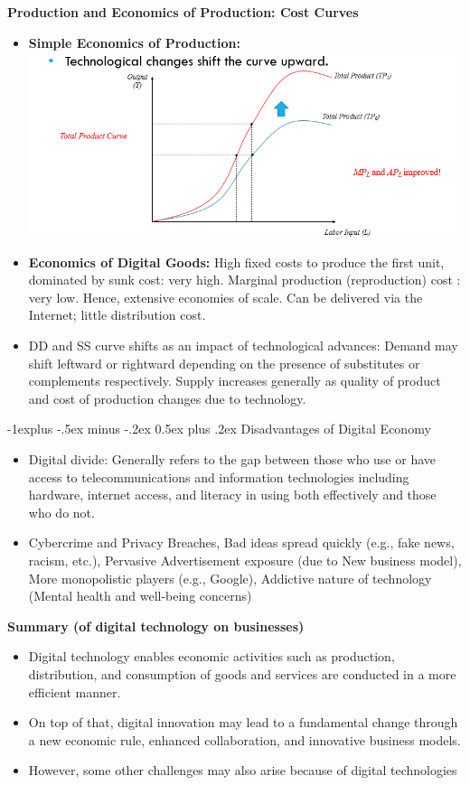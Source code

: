 \documentclass[12pt, landscape]{article}
\makeatletter
\renewcommand{\subsection}{\@startsection{subsection}{2}{0mm}%
                                {-1explus -.5ex minus -.2ex}%
                                {0.5ex plus .2ex}%
                                {\normalfont\normalsize\bfseries}}
\makeatother
\begin{document}
\begin{multicols*}{3}
\textbf{Production and Economics of Production: Cost Curves}
\begin{itemize}
\item \textbf{Simple Economics of Production:}
\includegraphics[width=0.7\linewidth]{technologicalChange}
\item \textbf{Economics of Digital Goods:} High fixed costs to produce the first unit, dominated by sunk cost: very high. Marginal production (reproduction) cost : very low. Hence, extensive economies of scale. Can be delivered via the Internet; little distribution cost.
\item DD and SS curve shifts as an impact of technological advances: Demand may shift leftward or rightward depending on the presence of substitutes or complements respectively. Supply increases generally as quality of product and cost of production changes due to technology.
\end{itemize}

\subsection{Disadvantages of Digital Economy}
\begin{itemize}
\item Digital divide: Generally refers to the gap between those who use or have access to telecommunications and information technologies including hardware, internet access, and literacy in using both effectively and those who do not.
\item Cybercrime and Privacy Breaches, Bad ideas spread quickly (e.g., fake news, racism, etc.), Pervasive Advertisement exposure (due to New business model), More monopolistic players (e.g., Google), Addictive nature of technology (Mental health and well-being concerns)
\end{itemize}

\textbf{Summary (of digital technology on businesses)}
\begin{itemize}
\item Digital technology enables economic activities such as production, distribution, and consumption of goods and services are conducted in a more efficient manner.
\item On top of that, digital innovation may lead to a fundamental change through a new economic rule, enhanced collaboration, and innovative business models.
\item However, some other challenges may also arise because of digital technologies
\end{itemize}






\end{multicols*}
\end{document}
